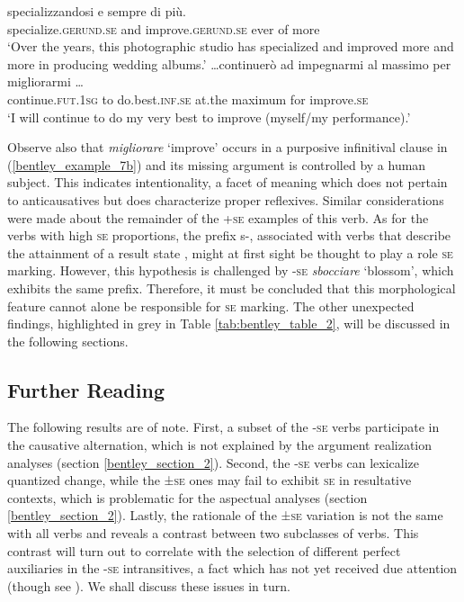 \documentclass[output=paper,colorlinks,citecolor=brown
]{langscibook}
\begin{document}
\ea \label{bentley_example_7}
    \ea \label{bentley_example_7a}
     specializzandosi e  sempre di	più. \\
    {} specialize.\textsc{gerund}.\textsc{se} and improve.\textsc{gerund}.\textsc{se} ever of more\\
    \glt ‘Over the years, this photographic studio has specialized and improved more and more in producing wedding albums.’
    \ex \label{bentley_example_7b}
    \gll  \ldots  continuerò ad impegnarmi al massimo per migliorarmi \ldots  \\
    continue.\textsc{fut}.1\textsc{sg}	to do.best.\textsc{inf}.\textsc{se} at.the maximum for improve.\textsc{se} \\
    \glt ‘I will continue to do my very best to improve (myself/my performance).’
    \z
\z

Observe also that \textit{migliorare} ‘improve’ occurs in a purposive infinitival clause in (\ref{bentley_example_7b}) and its missing argument is controlled by a human subject. This indicates intentionality, a facet of meaning which does not pertain to anticausatives but does characterize proper reflexives. Similar considerations were made about the remainder of the +\textsc{se} examples of this verb. 
As for the verbs with high \textsc{se} proportions, the prefix s-, associated with verbs that describe the attainment of a result state \citep[112, 146, 159]{iacobini2004prefissazione}, might at first sight be thought to play a role \textsc{se} marking. However, this hypothesis is challenged by -\textsc{se} \textit{sbocciare} ‘blossom’, which exhibits the same prefix. Therefore, it must be concluded that this morphological feature cannot alone be responsible for \textsc{se} marking. The other unexpected findings, highlighted in grey in Table \ref{tab:bentley_table_2}, will be discussed in the following sections.  

\subsection{Further Reading}
\label{bentley_section_3.3}
The following results are of note. First, a subset of the -\textsc{se} verbs participate in the causative alternation, which is not explained by the argument realization analyses (section \ref{bentley_section_2}). Second, the -\textsc{se} verbs can lexicalize quantized change, while the ±\textsc{se} ones may fail to exhibit \textsc{se} in resultative contexts, which is problematic for the aspectual analyses (section \ref{bentley_section_2}). Lastly, the rationale of the ±\textsc{se} variation is not the same with all verbs and reveals a contrast between two subclasses of verbs. 
This contrast will turn out to correlate with the selection of different perfect auxiliaries in the -\textsc{se} intransitives, a fact which has not yet received due attention (though see \cite{bentley2021two}). We shall discuss these issues in turn.
\end{document}
